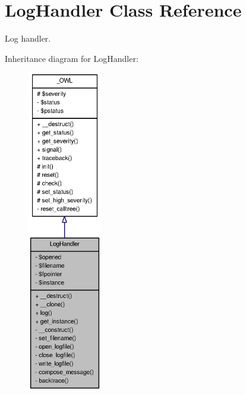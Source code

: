 \section{LogHandler Class Reference}
\label{classLogHandler}


Log handler.  




Inheritance diagram for LogHandler:\nopagebreak
\begin{figure}[H]
\begin{center}
\leavevmode
\includegraphics[height=400pt]{classLogHandler__inherit__graph}
\end{center}
\end{figure}



